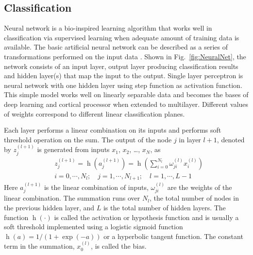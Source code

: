 \documentclass[aps,pra,reprint,longbibliography,superscriptaddress]{revtex4-1}
\DeclareMathOperator{\h}{h} %
\begin{document}
\subsection{Classification}

Neural network is a bio-inspired learning algorithm that works well in classification via supervised learning when adequate amount of training data is available. The basic artificial neural network can be described as a series of transformations performed on the input data \cite{bishop2006pattern, boddy1994neural}. Shown in Fig.~\ref{fig:NeuralNet}, the network consists of an input layer, output layer producing classification results and hidden layer(s) that map the input to the output. Single layer perceptron is neural network with one hidden layer using step function as activation function. This simple model works well on linearly separable data and becomes the bases of deep learning and cortical processor when extended to multilayer. Different values of weights correspond to different linear classification planes. 

\begin{figure*}
\caption{\label{fig:NeuralNet} Neural network architecture and training via area under the curve (AUC) of the receiver operating characteristics (ROC); Multivariate features of each measurement (cell) are feed into the neural network and the output shows classification labels, i.e. cell types. We train the weights of the last layer perceptron by optimizing the area under ROC curve. Each ROC curve corresponds to a set of weights for connections to an output node, generated by scanning the bias weight. AUC is proven to be statistically consistent and more discriminating than accuracy.}
\end{figure*}

Each layer performs a linear combination on its inputs and performs soft threshold operation on the sum. The output of the node $j$ in layer $l+1$, denoted by $z_j^{(l+1)}$ is generated from inputs $x_1$, $x_2$, \ldots, $x_N$, as
\begin{equation}
\begin{split}
& z_j^{(l+1)} = \h(a_j^{(l+1)}) = \h(\sum_{i=0}^{N_l} \omega_{ji}^{(l)} x_i^{(l)})\\
& i =0,\cdots,N_l;\quad j=1,\cdots,N_{l+1};\quad l=1,\cdots,L-1
\end{split}
\end{equation}
Here $a_j^{(l+1)}$ is the linear combination of inputs, $\omega_{ji}^{(l)}$ are the weights of the linear combination. The summation runs over $N_l$, the total number of nodes in the previous hidden layer, and $L$ is the total number of hidden layers. The function $\h(\cdot)$ is called the activation or hypothesis function and is usually a soft threshold implemented using a logistic sigmoid function $\h(a)=1/(1+\exp(-a))$ or a hyperbolic tangent function. The constant term in the summation, $x_0^{(l)}$, is called the bias.
\end{document}
